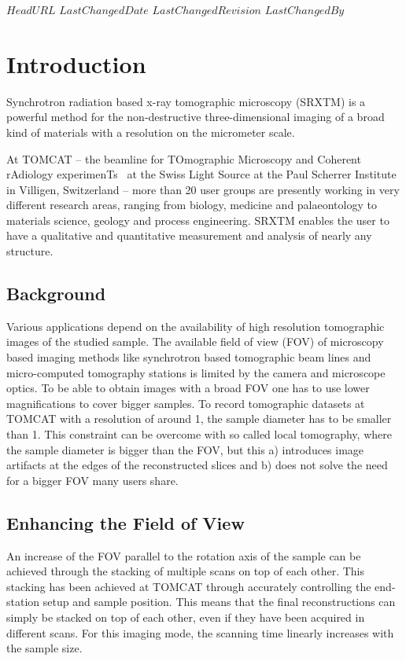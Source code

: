 \svnidlong
{$HeadURL$}
{$LastChangedDate$}
{$LastChangedRevision$}
{$LastChangedBy$}
\section{Introduction}
Synchrotron radiation based x-ray tomographic microscopy (SRXTM) is a powerful method for the non-destructive three-dimensional imaging of a broad kind of materials with a resolution on the micrometer scale.

At TOMCAT -- the beamline for TOmographic Microscopy and Coherent rAdiology experimenTs~\cite{Stampanoni2007} at the Swiss Light Source at the Paul Scherrer Institute in Villigen, Switzerland -- more than 20 user groups are presently working in very different research areas, ranging from biology, medicine and palaeontology to materials science, geology and process engineering. SRXTM enables the user to have a qualitative and quantitative measurement and analysis of nearly any structure.

\subsection{Background}
Various applications depend on the availability of high resolution tomographic images of the studied sample. The available field of view (FOV) of microscopy based imaging methods like synchrotron based tomographic beam lines and micro-computed tomography stations is limited by the camera and microscope optics. To be able to obtain images with a broad FOV one has to use lower magnifications to cover bigger samples. 
To record tomographic datasets at TOMCAT with a resolution of around \unit{1}{\micro\meter}, the sample diameter has to be smaller than \unit{1}{\milli\meter}. This constraint can be overcome with so called local tomography, where the sample diameter is bigger than the FOV, but this a) introduces image artifacts at the edges of the reconstructed slices and b) does not solve the need for a bigger FOV many users share.

\subsection{Enhancing the Field of View}
\label{subsec:enhancing the field of view}
An increase of the FOV parallel to the rotation axis of the sample can be achieved through the stacking of multiple scans on top of each other. This stacking has been achieved at TOMCAT through accurately controlling the end-station setup and sample position.
This means that the final reconstructions can simply be stacked on top of each other, even if they have been acquired in different scans. For this imaging mode, the scanning time linearly increases with the sample size.

